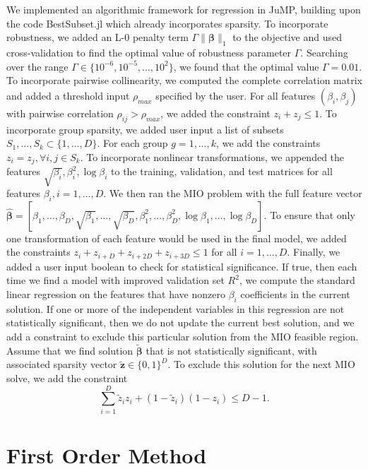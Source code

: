 \documentclass[12pt]{article}
\newcommand{\M}{\mathbf}
\newcommand{\MS}{\boldsymbol}
\newcommand{\1}{\mathds{1}}
\begin{document}
We implemented an algorithmic framework for regression in JuMP, building upon the code BestSubset.jl which already incorporates sparsity.  To incorporate robustness, we added an L-0 penalty term $\Gamma \|\MS \beta\|_1$ to the objective and used cross-validation to find the optimal value of robustness parameter $\Gamma$. Searching over the range $\Gamma \in \{10^{-6},10^{-5},\ldots,10^2\}$, we found that the optimal value $\Gamma = 0.01$.  To incorporate pairwise collinearity, we computed the complete correlation matrix and added a threshold input $\rho_{max}$ specified by the user.  For all features $(\beta_i, \beta_j)$ with pairwise correlation $\rho_{ij} > \rho_{max}$, we added the constraint $z_i + z_j \le 1$.  To incorporate group sparsity, we added user input a list of subsets $S_1,\ldots, S_k \subset \{1,\ldots, D\}$.  For each group $g = 1,\ldots,k$, we add the constraints $z_i = z_j, \forall i,j \in S_k$.  To incorporate nonlinear transformations, we appended the features $\sqrt{\beta_i}, \beta_i^2, \log \beta_i$ to the training, validation, and test matrices for all features $\beta_i, i=1,\ldots,D$.  We then ran the MIO problem with the full feature vector $\hat{\MS \beta} = [\beta_1,\ldots, \beta_D, \sqrt{\beta_1}, \ldots, \sqrt{\beta_D}, \beta_1^2, \ldots, \beta_D^2, \log \beta_1, \ldots, \log \beta_D]$.   To ensure that only one transformation of each feature would be used in the final model, we added the constraints $z_i + z_{i+D} + z_{i+2D} + z_{i+3D} \le 1$ for all $i = 1,\ldots,D$.    Finally, we added a user input boolean to check for statistical significance.  If true, then each time we find a model with improved validation set $R^2$, we compute the standard linear regression on the features that have nonzero $\beta_i$ coefficients in the current solution.  If one or more of the independent variables in this regression are not statistically significant, then we do not update the current best solution, and we add a constraint to exclude this particular solution from the MIO feasible region.  Assume that we find solution $\MS {\tilde \beta}$ that is not statistically significant, with associated sparsity vector $\M {\tilde z} \in \{0,1\}^D$.  To exclude this solution for the next MIO solve, we add the constraint
\[
\sum_{i=1}^D {\tilde z_i} z_i + (1 - {\tilde z_i})(1 - z_i) \le D - 1.
\]  

\section{First Order Method}
\end{document}
